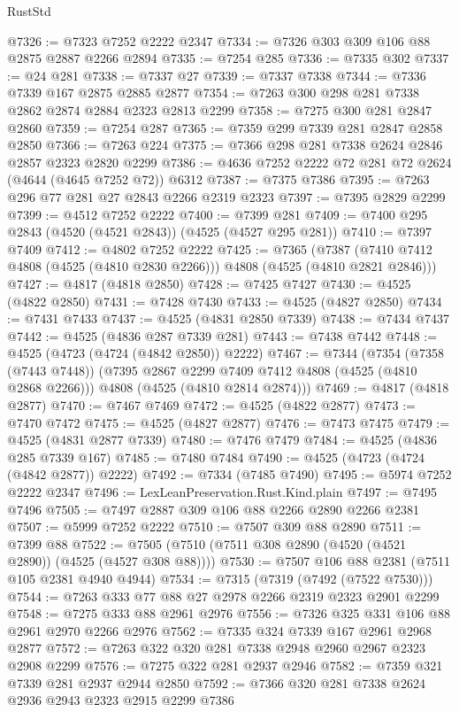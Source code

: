 \begin{lexlean}{RustStd}
\begin{coremodule}
@7326 := @7323 @7252 @2222 @2347
@7334 := @7326 @303 @309 @106 @88 @2875 @2887 @2266 @2894
@7335 := @7254 @285
@7336 := @7335 @302
@7337 := @24 @281
@7338 := @7337 @27
@7339 := @7337 @7338
@7344 := @7336 @7339 @167 @2875 @2885 @2877
@7354 := @7263 @300 @298 @281 @7338 @2862 @2874 @2884 @2323 @2813 @2299
@7358 := @7275 @300 @281 @2847 @2860
@7359 := @7254 @287
@7365 := @7359 @299 @7339 @281 @2847 @2858 @2850
@7366 := @7263 @224
@7375 := @7366 @298 @281 @7338 @2624 @2846 @2857 @2323 @2820 @2299
@7386 := @4636 @7252 @2222 @72 @281 @72 @2624 (@4644 (@4645 @7252 @72)) @6312
@7387 := @7375 @7386
@7395 := @7263 @296 @77 @281 @27 @2843 @2266 @2319 @2323
@7397 := @7395 @2829 @2299
@7399 := @4512 @7252 @2222
@7400 := @7399 @281
@7409 := @7400 @295 @2843 (@4520 (@4521 @2843)) (@4525 (@4527 @295 @281))
@7410 := @7397 @7409
@7412 := @4802 @7252 @2222
@7425 := @7365
    (@7387 (@7410 @7412 @4808 (@4525 (@4810 @2830 @2266))) @4808 (@4525 (@4810 @2821 @2846)))
@7427 := @4817 (@4818 @2850)
@7428 := @7425 @7427
@7430 := @4525 (@4822 @2850)
@7431 := @7428 @7430
@7433 := @4525 (@4827 @2850)
@7434 := @7431 @7433
@7437 := @4525 (@4831 @2850 @7339)
@7438 := @7434 @7437
@7442 := @4525 (@4836 @287 @7339 @281)
@7443 := @7438 @7442
@7448 := @4525 (@4723 (@4724 (@4842 @2850)) @2222)
@7467 := @7344
    (@7354
      (@7358 (@7443 @7448))
      (@7395 @2867 @2299 @7409 @7412 @4808 (@4525 (@4810 @2868 @2266)))
      @4808
      (@4525 (@4810 @2814 @2874)))
@7469 := @4817 (@4818 @2877)
@7470 := @7467 @7469
@7472 := @4525 (@4822 @2877)
@7473 := @7470 @7472
@7475 := @4525 (@4827 @2877)
@7476 := @7473 @7475
@7479 := @4525 (@4831 @2877 @7339)
@7480 := @7476 @7479
@7484 := @4525 (@4836 @285 @7339 @167)
@7485 := @7480 @7484
@7490 := @4525 (@4723 (@4724 (@4842 @2877)) @2222)
@7492 := @7334 (@7485 @7490)
@7495 := @5974 @7252 @2222 @2347
@7496 := LexLeanPreservation.Rust.Kind.plain
@7497 := @7495 @7496
@7505 := @7497 @2887 @309 @106 @88 @2266 @2890 @2266 @2381
@7507 := @5999 @7252 @2222
@7510 := @7507 @309 @88 @2890
@7511 := @7399 @88
@7522 := @7505 (@7510 (@7511 @308 @2890 (@4520 (@4521 @2890)) (@4525 (@4527 @308 @88))))
@7530 := @7507 @106 @88 @2381 (@7511 @105 @2381 @4940 @4944)
@7534 := @7315 (@7319 (@7492 (@7522 @7530)))
@7544 := @7263 @333 @77 @88 @27 @2978 @2266 @2319 @2323 @2901 @2299
@7548 := @7275 @333 @88 @2961 @2976
@7556 := @7326 @325 @331 @106 @88 @2961 @2970 @2266 @2976
@7562 := @7335 @324 @7339 @167 @2961 @2968 @2877
@7572 := @7263 @322 @320 @281 @7338 @2948 @2960 @2967 @2323 @2908 @2299
@7576 := @7275 @322 @281 @2937 @2946
@7582 := @7359 @321 @7339 @281 @2937 @2944 @2850
@7592 := @7366 @320 @281 @7338 @2624 @2936 @2943 @2323 @2915 @2299 @7386

\end{coremodule}
\end{lexlean}
